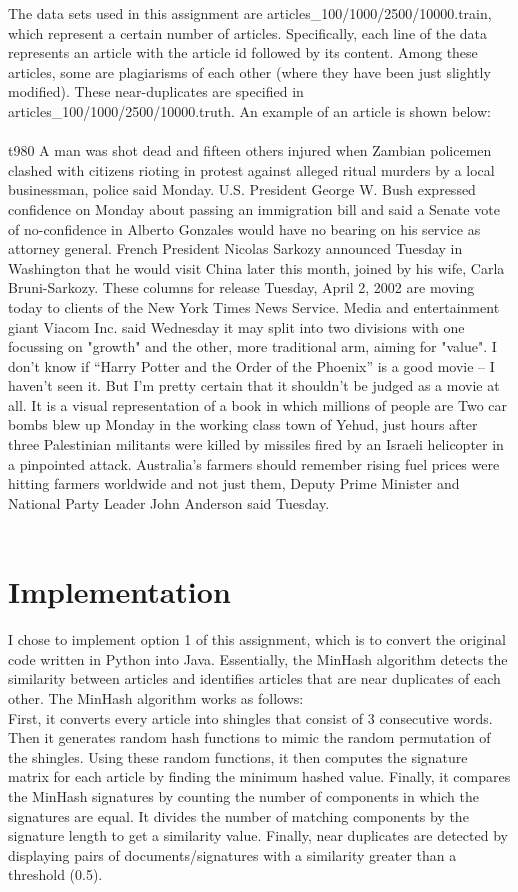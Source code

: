 \documentclass[9pt,twoside]{exam}
\begin{document}
The data sets used in this assignment are articles\_100/1000/2500/10000.train, which represent a certain number of articles. Specifically, each line of the data represents an article with the article id followed by its content. Among these articles, some are plagiarisms of each other (where they have been just slightly modified). These near-duplicates are specified in articles\_100/1000/2500/10000.truth. An example of an article is shown below:
\\\\
t980 A man was shot dead and fifteen others injured when Zambian policemen clashed with citizens rioting in protest against alleged ritual murders by a local businessman, police said Monday. U.S. President George W. Bush expressed confidence on Monday about passing an immigration bill and said a Senate vote of no-confidence in Alberto Gonzales would have no bearing on his service as attorney general. French President Nicolas Sarkozy announced Tuesday in Washington that he would visit China later this month, joined by his wife, Carla Bruni-Sarkozy. These columns for release Tuesday, April 2, 2002 are moving today to clients of the New York Times News Service. Media and entertainment giant Viacom Inc. said Wednesday it may split into two divisions with one focussing on "growth" and the other, more traditional arm, aiming for "value". I don't know if ``Harry Potter and the Order of the Phoenix'' is a good movie -- I haven't seen it. But I'm pretty certain that it shouldn't be judged as a movie at all. It is a visual representation of a book in which millions of people are Two car bombs blew up Monday in the working class town of Yehud, just hours after three Palestinian militants were killed by missiles fired by an Israeli helicopter in a pinpointed attack. Australia's farmers should remember rising fuel prices were hitting farmers worldwide and not just them, Deputy Prime Minister and National Party Leader John Anderson said Tuesday.
\\
\\
\section*{Implementation}

I chose to implement option 1 of this assignment, which is to convert the original code written in Python into Java. Essentially, the MinHash algorithm detects the similarity between articles and identifies articles that are near duplicates of each other. The MinHash algorithm works as follows: \\
First, it converts every article into shingles that consist of 3 consecutive words. Then it generates random hash functions to mimic the random permutation of the shingles. Using these random functions, it then computes the signature matrix for each article by finding the minimum hashed value. Finally, it compares the MinHash signatures by counting the number of components in which the signatures are equal. It divides the number of matching components by the signature length to get a similarity value. Finally, near duplicates are detected by displaying pairs of documents/signatures with a similarity greater than a
threshold (0.5).
\end{document}
